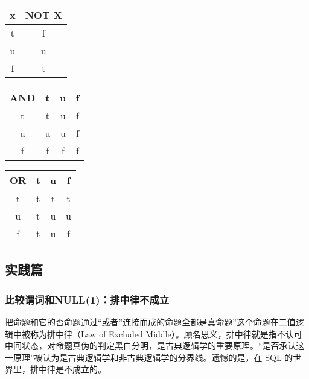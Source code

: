 \begin{table}

    \centering
    \begin{minipage}{.3\textwidth}
        \centering
        \begin{tabular}{cc}
            \hline
            x & NOT X \\
            \hline
            t & f     \\
            u & u     \\
            f & t     \\
            \hline
        \end{tabular}
    \end{minipage}\quad
    \begin{minipage}{.3\textwidth}
        \centering
        \begin{tabular}{cccc}
            \hline
            AND & t & u & f \\
            \hline
            t   & t & u & f \\
            u   & u & u & f \\
            f   & f & f & f \\
            \hline
        \end{tabular}
    \end{minipage}\quad
    \begin{minipage}{.3\textwidth}
        \centering
        \begin{tabular}{cccc}
            \hline
            OR & t & u & f \\
            \hline
            t  & t & t & t \\
            u  & t & u & u \\
            f  & t & u & f \\
            \hline
        \end{tabular}
    \end{minipage}
\end{table}
\subsection{实践篇}
\subsubsection*{比较谓词和NULL(1)：排中律不成立}
把命题和它的否命题通过“或者”连接而成的命题全都是真命题”这个命题在二值逻辑中被称为排中律（Law of Excluded Middle）。顾名思义，排中律就是指不认可中间状态，对命题真伪的判定黑白分明，是古典逻辑学的重要原理。“是否承认这一原理”被认为是古典逻辑学和非古典逻辑学的分界线。遗憾的是，在 SQL 的世界里，排中律是不成立的。
